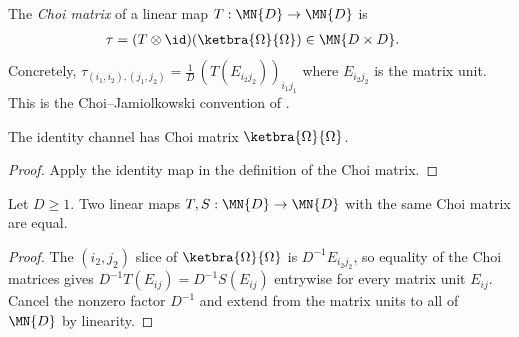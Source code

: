 \begin{definition}\label{def:choi_matrix}
    \leanok
    The \emph{Choi matrix} of a linear map
    $T : \MN{D} \to \MN{D}$ is
    \begin{align}
        \tau
        &= (T \otimes \id)(\ketbra{\Omega}{\Omega})
        \in \MN{D \times D}.
        \label{eq:representations_choi}
    \end{align}
    Concretely,
    $\tau_{(i_1,i_2),(j_1,j_2)}
        = \frac{1}{D}\,(T(E_{i_2 j_2}))_{i_1 j_1}$
    where $E_{i_2 j_2}$ is the matrix unit.
    This is the Choi--Jamiol\-kowski convention of
    \cite[Proposition~2.1]{Wolf2012Quantum}.

\end{definition}

\begin{theorem}\label{thm:choi_matrix_id}
    \leanok
    The identity channel has Choi matrix
    $\ketbra{\Omega}{\Omega}$.
\end{theorem}

\begin{proof}\leanok
    Apply the identity map in the definition of the Choi matrix.
\end{proof}

\begin{lemma}\label{lem:choi_matrix_injective}
    \leanok
    Let $D\geq1$. Two linear maps $T,S:\MN{D}\to\MN{D}$ with the same Choi
    matrix are equal.
\end{lemma}

\begin{proof}\leanok
    The $(i_2,j_2)$ slice of $\ketbra{\Omega}{\Omega}$ is $D^{-1}E_{i_2j_2}$,
    so equality of the Choi matrices gives
    $D^{-1}T(E_{ij})=D^{-1}S(E_{ij})$ entrywise for every matrix unit
    $E_{ij}$. Cancel the nonzero factor $D^{-1}$ and extend from the matrix
    units to all of $\MN{D}$ by linearity.
\end{proof}


